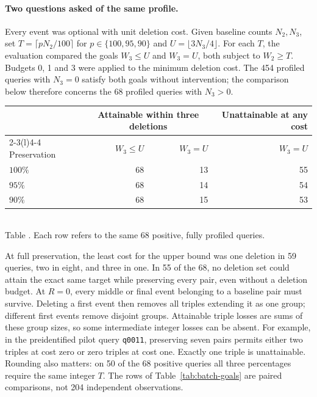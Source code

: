 \paragraph{Two questions asked of the same profile.}
Every event was optional with unit deletion cost. Given baseline counts
$N_2,N_3$, set $T=\lceil pN_2/100\rceil$ for $p\in\{100,95,90\}$ and
$U=\lfloor 3N_3/4\rfloor$. For each $T$, the evaluation compared the goals $W_3\le U$ and
$W_3=U$, both subject to $W_2\ge T$. Budgets 0, 1 and 3 were applied to
the minimum deletion cost. The 454 profiled queries with $N_3=0$ satisfy
both goals without intervention; the comparison below therefore concerns
the 68 profiled queries with $N_3>0$.

\begin{center}
\begin{tabular}{lrrr}
\toprule
 & \multicolumn{2}{c}{Attainable within three deletions}
 & Unattainable at any cost\\
\cmidrule(lr){2-3}\cmidrule(l){4-4}
Preservation & $W_3\le U$ & $W_3=U$ & $W_3=U$\\
\midrule
$100\%$ & 68 & 13 & 55\\
$95\%$  & 68 & 14 & 54\\
$90\%$  & 68 & 15 & 53\\
\bottomrule
\end{tabular}
\label{tab:batch-goals}\\[3pt]
{\small Table \thetable. Each row refers to the same 68 positive, fully profiled queries.}
\end{center}

At full preservation, the least cost for the upper bound was one deletion in
59 queries, two in eight, and three in one. In 55 of the 68, no deletion set
could attain the exact same target while preserving every pair, even without
a deletion budget. At $R=0$, every middle or final event belonging to a
baseline pair must survive. Deleting a first event then removes all triples
extending it as one group; different first events remove disjoint groups.
Attainable triple losses are sums of these group sizes, so some intermediate
integer losses can be absent. For example, in the preidentified pilot
query \texttt{q0011}, preserving seven pairs permits either two triples at
cost zero or zero triples at cost one. Exactly one triple is unattainable.
Rounding also matters: on 50 of the 68 positive queries all three
percentages require the same integer $T$. The rows of
Table~\ref{tab:batch-goals} are paired comparisons, not 204 independent
observations.

